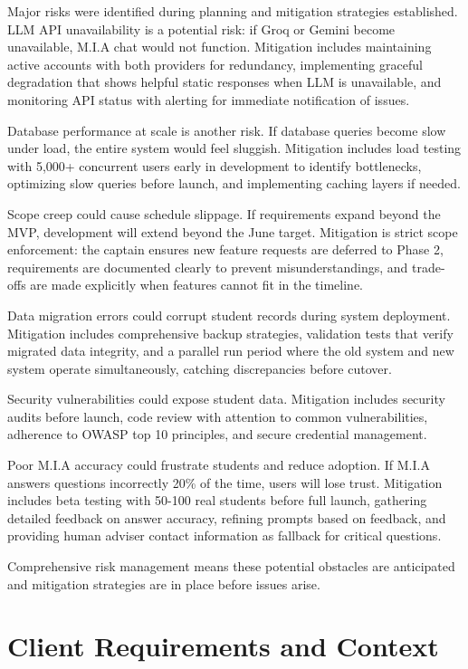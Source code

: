 \documentclass[12pt,a4paper]{report}
\begin{document}
Major risks were identified during planning and mitigation strategies established. LLM API unavailability is a potential risk: if Groq or Gemini become unavailable, M.I.A chat would not function. Mitigation includes maintaining active accounts with both providers for redundancy, implementing graceful degradation that shows helpful static responses when LLM is unavailable, and monitoring API status with alerting for immediate notification of issues.

Database performance at scale is another risk. If database queries become slow under load, the entire system would feel sluggish. Mitigation includes load testing with 5,000+ concurrent users early in development to identify bottlenecks, optimizing slow queries before launch, and implementing caching layers if needed.

Scope creep could cause schedule slippage. If requirements expand beyond the MVP, development will extend beyond the June target. Mitigation is strict scope enforcement: the captain ensures new feature requests are deferred to Phase 2, requirements are documented clearly to prevent misunderstandings, and trade-offs are made explicitly when features cannot fit in the timeline.

Data migration errors could corrupt student records during system deployment. Mitigation includes comprehensive backup strategies, validation tests that verify migrated data integrity, and a parallel run period where the old system and new system operate simultaneously, catching discrepancies before cutover.

Security vulnerabilities could expose student data. Mitigation includes security audits before launch, code review with attention to common vulnerabilities, adherence to OWASP top 10 principles, and secure credential management.

Poor M.I.A accuracy could frustrate students and reduce adoption. If M.I.A answers questions incorrectly 20\% of the time, users will lose trust. Mitigation includes beta testing with 50-100 real students before full launch, gathering detailed feedback on answer accuracy, refining prompts based on feedback, and providing human adviser contact information as fallback for critical questions.

Comprehensive risk management means these potential obstacles are anticipated and mitigation strategies are in place before issues arise.

\chapter{Client Requirements and Context}
\end{document}

